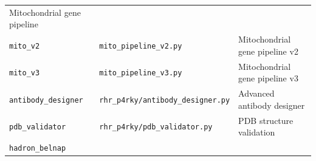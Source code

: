 \documentclass[12pt,a4paper]{article}
\begin{document}
\begin{longtable}[]{@{}lll@{}}
\begin{minipage}[t]{0.43\columnwidth}
Mitochondrial gene pipeline\strut
\end{minipage}\tabularnewline
\begin{minipage}[t]{0.24\columnwidth}\raggedright
\texttt{mito\_v2}\strut
\end{minipage} & \begin{minipage}[t]{0.24\columnwidth}\raggedright
\texttt{mito\_pipeline\_v2.py}\strut
\end{minipage} & \begin{minipage}[t]{0.43\columnwidth}\raggedright
Mitochondrial gene pipeline v2\strut
\end{minipage}\tabularnewline
\begin{minipage}[t]{0.24\columnwidth}\raggedright
\texttt{mito\_v3}\strut
\end{minipage} & \begin{minipage}[t]{0.24\columnwidth}\raggedright
\texttt{mito\_pipeline\_v3.py}\strut
\end{minipage} & \begin{minipage}[t]{0.43\columnwidth}\raggedright
Mitochondrial gene pipeline v3\strut
\end{minipage}\tabularnewline
\begin{minipage}[t]{0.24\columnwidth}\raggedright
\texttt{antibody\_designer}\strut
\end{minipage} & \begin{minipage}[t]{0.24\columnwidth}\raggedright
\texttt{rhr\_p4rky/antibody\_designer.py}\strut
\end{minipage} & \begin{minipage}[t]{0.43\columnwidth}\raggedright
Advanced antibody designer\strut
\end{minipage}\tabularnewline
\begin{minipage}[t]{0.24\columnwidth}\raggedright
\texttt{pdb\_validator}\strut
\end{minipage} & \begin{minipage}[t]{0.24\columnwidth}\raggedright
\texttt{rhr\_p4rky/pdb\_validator.py}\strut
\end{minipage} & \begin{minipage}[t]{0.43\columnwidth}\raggedright
PDB structure validation\strut
\end{minipage}\tabularnewline
\begin{minipage}[t]{0.24\columnwidth}\raggedright
\texttt{hadron\_belnap}\strut
\end{minipage} & \begin{minipage}[t]{0.24\columnwidth}\raggedright

\end{minipage}
\end{longtable}
\end{document}
